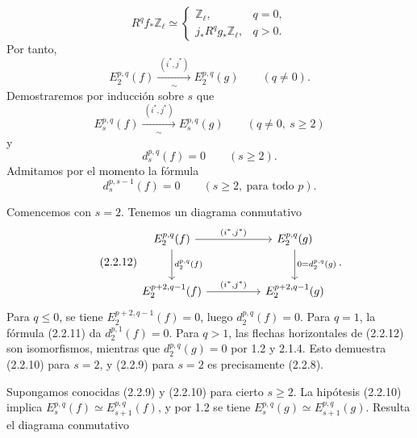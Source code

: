 \begin{equation}\tag{2.2.7}
R^qf_*\mathbb Z_\ell\simeq
\begin{cases}
\mathbb Z_\ell,&q=0,\\[1ex]
j_*R^qg_*\mathbb Z_\ell,&q>0.
\end{cases}
\end{equation}
Por tanto,
\begin{equation}\tag{2.2.8}
E_2^{p,q}(f)
\xrightarrow[\ \sim\ ]{\ (i^*,j^*)\ }
E_2^{p,q}(g)
\qquad(q\ne0).
\end{equation}
Demostraremos por inducción sobre $s$ que
\begin{equation}\tag{2.2.9}
E_s^{p,q}(f)
\xrightarrow[\ \sim\ ]{\ (i^*,j^*)\ }
E_s^{p,q}(g)
\qquad(q\ne0,\ s\geq2)
\end{equation}
y
\begin{equation}\tag{2.2.10}
d_s^{p,q}(f)=0\qquad(s\geq2).
\end{equation}
Admitamos por el momento la fórmula
\begin{equation}\tag{2.2.11}
d_s^{p,s-1}(f)=0\qquad(s\geq2,\ \text{para todo }p).
\end{equation}

Comencemos con $s=2$. Tenemos un diagrama conmutativo
\begin{equation}\tag{2.2.12}
\begin{tikzcd}[column sep=huge,row sep=large]
E_2^{p,q}(f)
  \arrow[r,"{(i^*,j^*)}"]
  \arrow[d,"{d_2^{p,q}(f)}"]
&
E_2^{p,q}(g)
  \arrow[d,"{0=d_2^{p,q}(g)}"]
\\
E_2^{p+2,q-1}(f)
  \arrow[r,"{(i^*,j^*)}"]
&
E_2^{p+2,q-1}(g)
\end{tikzcd}.
\end{equation}
Para $q\leq0$, se tiene $E_2^{p+2,q-1}(f)=0$, luego
$d_2^{p,q}(f)=0$. Para $q=1$, la fórmula (2.2.11) da
$d_2^{p,1}(f)=0$. Para $q>1$, las flechas horizontales de (2.2.12)
son isomorfismos, mientras que $d_2^{p,q}(g)=0$ por 1.2 y 2.1.4.
Esto demuestra (2.2.10) para $s=2$, y (2.2.9) para $s=2$ es
precisamente (2.2.8).

Supongamos conocidas (2.2.9) y (2.2.10) para cierto $s\geq2$.
La hipótesis (2.2.10) implica
$E_s^{p,q}(f)\simeq E_{s+1}^{p,q}(f)$, y por 1.2 se tiene
$E_s^{p,q}(g)\simeq E_{s+1}^{p,q}(g)$. Resulta el diagrama conmutativo

\pageoriginale

